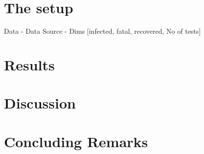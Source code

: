 \documentclass[12pt]{article}
\begin{document}
		\section{The setup}
		\label{SEC2}
		Data - Data Source - Dims [infected, fatal, recovered, No of tests] 
		
		
		
		\section{Results}
		\label{SEC3}
		
		\section{Discussion}
		\label{SEC4}
		
		
		\section{Concluding Remarks}
		\label{SEC5}
		
		
			
	
\end{document}
